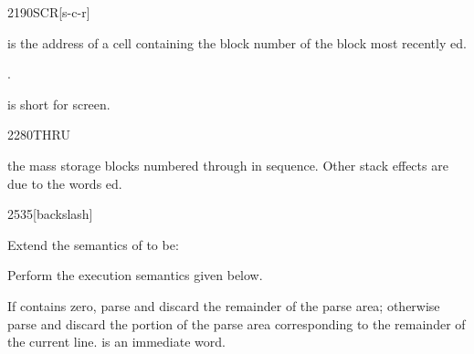 \begin{worddef}{2190}{SCR}[s-c-r]
\item {}

	 is the address of a cell containing the block
	number of the block most recently ed.

\see {}.

	\begin{rationale} %
		 is short for screen.
	\end{rationale}
\end{worddef}


\begin{worddef}{2280}{THRU}
\item {}

	 the mass storage blocks numbered  through
	 in sequence. Other stack effects are due to the words
	ed.
\end{worddef}


\begin{worddef}[bs]{2535}{\bs}[backslash]
\item Extend the semantics of  to be:

\compile
	Perform the execution semantics given below.

\execute

	If  contains zero, parse and discard the remainder
	of the parse area; otherwise parse and discard the portion
	of the parse area corresponding to the remainder of the current
	line.  is an immediate word.
\end{worddef}
